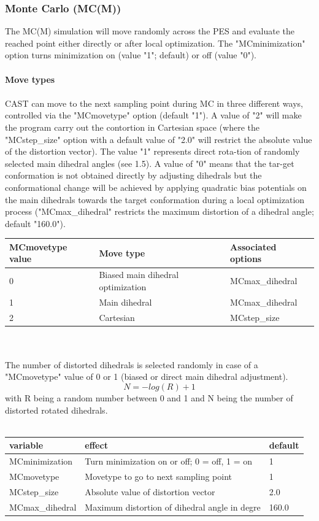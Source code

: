 \documentclass[10pt,a4paper]{article} %
\begin{document}
	\subsubsection{Monte Carlo (MC(M))}
	The MC(M) simulation will move randomly across the PES and evaluate the reached point either directly or after local optimization. The "MCminimization" option turns minimization on (value "1"; default) or off (value "0"). \\~\\
	\textbf{Move types}\\~\\
	\ac{CAST} can move to the next sampling point during MC in three different ways, controlled via the "MCmovetype" option (default "1"). A value of "2" will make the program carry out the contortion in Cartesian space (where the "MCstep_size" option with a default value of "2.0" will restrict the absolute value of the distortion vector). The value "1" represents direct rota-tion of randomly selected main dihedral angles (see 1.5). A value of "0" means that the tar-get conformation is not obtained directly by adjusting dihedrals but the conformational change will be achieved by applying quadratic bias potentials on the main dihedrals towards the target conformation during a local optimization process ("MCmax_dihedral" restricts the maximum distortion of a dihedral angle; default "160.0"). \\

	\begin{tabularx}{\textwidth}{l|X|X}
		MCmovetype value & Move type & Associated options \\
		\hline
		0 & Biased main dihedral optimization & MCmax_dihedral \\
		1 & Main dihedral & MCmax_dihedral \\
		2 & Cartesian & MCstep_size \\
	\end{tabularx}
	\\~\\
	The number of distorted dihedrals is selected randomly in case of a "MCmovetype" value of 0 or 1 (biased or direct main dihedral adjustment).
	\begin{equation}
	N = - log (R) + 1
	\end{equation}
	with R being a random number between 0 and 1 and N being the number of distorted rotated dihedrals.\\~\\
	\begin{tabularx}{\textwidth}{l|X|X}
		variable & effect & default \\
		\hline
		MCminimization & Turn minimization on or off; 0 = off, 1 = on & 1 \\
		MCmovetype & Movetype to go to next sampling point & 1 \\
		MCstep_size & Absolute value of distortion vector & 2.0 \\
		MCmax_dihedral & Maximum distortion of dihedral angle in degre & 160.0 \\
	\end{tabularx}
	\\~\\
\end{document}
